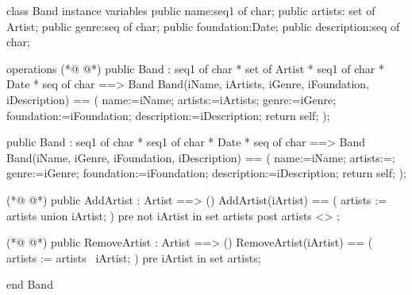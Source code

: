 \begin{vdmpp}[breaklines=true]
class Band
instance variables
  public name:seq1 of char;
  public artists: set of Artist;
  public genre:seq of char;
  public foundation:Date;
  public description:seq of char;

operations
(*@
\label{Band:10}
@*)
  public  Band : seq1 of char * set of Artist * seq1 of char * Date * seq of char  ==> Band
  Band(iName, iArtists, iGenre, iFoundation, iDescription) == (
   name:=iName;
   artists:=iArtists;
   genre:=iGenre;
   foundation:=iFoundation;
   description:=iDescription;
   return self;
  );
  
  public  Band : seq1 of char * seq1 of char * Date * seq of char  ==> Band
  Band(iName, iGenre, iFoundation, iDescription) == (
   name:=iName;
   artists:={};
   genre:=iGenre;
   foundation:=iFoundation;
   description:=iDescription;
   return self;
  );

(*@
\label{AddArtist:30}
@*)
  public AddArtist : Artist  ==> ()
  AddArtist(iArtist) == (
    artists := artists union {iArtist};
 )
  pre
   not iArtist in set artists
  post 
  artists <> {};
    
(*@
\label{RemoveArtist:39}
@*)
  public RemoveArtist : Artist  ==> ()
  RemoveArtist(iArtist) == (
   artists := artists \ {iArtist};
  )
  pre
   iArtist in set artists;
   
end Band
\end{vdmpp}
